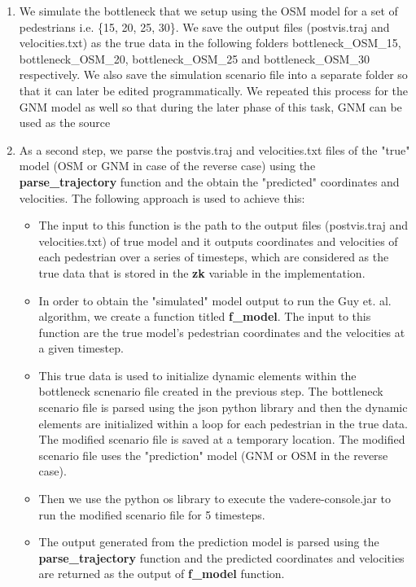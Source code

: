 \documentclass[10pt,a4paper]{article}
\begin{document}
\begin{enumerate}
	\item We simulate the bottleneck that we setup using the OSM model for a set of pedestrians i.e. \{15, 20, 25, 30\}. We save the output files (postvis.traj and velocities.txt) as the true data in the following folders bottleneck\_OSM\_15, bottleneck\_OSM\_20, bottleneck\_OSM\_25 and bottleneck\_OSM\_30 respectively. We also save the simulation scenario file into a separate folder so that it can later be edited programmatically. We repeated this process for the GNM model as well so that during the later phase of this task, GNM can be used as the source
	\item As a second step, we parse the postvis.traj and velocities.txt files of the "true" model (OSM or GNM in case of the reverse case) using the \textbf{parse\_trajectory} function and the obtain the "predicted" coordinates and velocities. The following approach is used to achieve this:
	\begin{itemize}
			\item The input to this function is the path to the output files (postvis.traj and velocities.txt) of true model and it outputs coordinates and velocities of each pedestrian over a series of timesteps, which are considered as the true data that is stored in the \textbf{zk} variable in the implementation. 
			\item In order to obtain the "simulated" model output to run the Guy et. al. algorithm, we create a function titled \textbf{f\_model}. The input to this function are the true model's pedestrian coordinates and the velocities at a given timestep.
			\item This true data is used to initialize dynamic elements within the bottleneck scnenario file created in the previous step. The bottleneck scenario file is parsed using the json python library and then the dynamic elements are initialized within a loop for each pedestrian in the true data. The modified scenario file is saved at a temporary location. The modified scenario file uses the "prediction" model (GNM or OSM in the reverse case).
			\item Then we use the python os library to execute the vadere-console.jar to run the modified scenario file for 5 timesteps. 
			\item The output generated from the prediction model is parsed using the \textbf{parse\_trajectory} function and the predicted coordinates and velocities are returned as the output of \textbf{f\_model} function.
	\end{itemize}

\end{enumerate}
\end{document}
